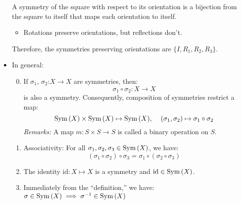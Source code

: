 \begin{itemize}
\begin{example}
\begin{center}
        \end{center}
        A symmetry of the square with respect to its orientation is a bijection from the square to itself that maps each orientation to itself.
        \begin{itemize}
            \item Rotations preserve orientations, but reflections don't.
        \end{itemize}
        Therefore, the symmetries preserving orientations are $\{I, R_1, R_2, R_3\}$.
    \end{example}
    \item In general:
    \begin{enumerate}
        \setcounter{enumi}{-1}
        \item If $\sigma_1$, $\sigma_2$:$X\rightarrow X$ are symmetries, then:
        \begin{equation}
            \sigma_1 \circ \sigma_2:X\rightarrow X
        \end{equation}
        is also a symmetry. Consequently, composition of symmetries restrict a map:
        \begin{equation}
            \mathrm{Sym}\,(X) \times \mathrm{Sym}\,(X) \mapsto \mathrm{Sym}\,(X),\,\quad (\sigma_1,\sigma_2) \mapsto \sigma_1 \circ \sigma_2
        \end{equation}
        \textit{Remarks:} A map $m:S\times S \rightarrow S$ is called a binary operation on $S$.
        \item Associativity: For all $\sigma_1,\sigma_2,\sigma_3 \in \mathrm{Sym}\,(X)$, we have:
        \begin{equation}
        (\sigma_1\circ\sigma_2)\circ\sigma_3 = \sigma_1 \circ (\sigma_2\circ \sigma_3)
        \end{equation}
        \item The identity $\text{id}: X\mapsto X$ is a symmetry and $\text{id} \in \mathrm{Sym}\,(X)$.
        \item Immediately from the ``definition,'' we have: $\sigma \in \mathrm{Sym}\,(X) \implies \sigma^{-1} \in \mathrm{Sym}\,(X)$

\end{enumerate}
\end{itemize}
